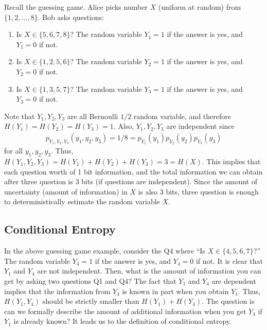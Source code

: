 \documentclass{article}
\begin{document}
\begin{example}
    Recall the guessing game.
    Alice picks number $X$ (uniform at random) from $\{1, 2, \dots, 8\}$.
    Bob asks questions:
    \begin{enumerate}[Q1:]
        \item Is $X\in\{5, 6, 7, 8\}$? The random variable $Y_1=1$ if the answer is yes, and $Y_1=0$ if not.
        \item Is $X\in\{1, 2, 5, 6\}$? The random variable $Y_2=1$ if the answer is yes, and $Y_2=0$ if not.
        \item Is $X\in\{1, 3, 5, 7\}$? The random variable $Y_3=1$ if the answer is yes, and $Y_3=0$ if not.
    \end{enumerate}
    Note that $Y_1, Y_2, Y_3$ are all Bernoulli $1/2$ random variable, and therefore $H(Y_1) = H(Y_2) = H(Y_3) = 1$.
    Also, $Y_1, Y_2, Y_3$ are independent since
    \begin{align}
        p_{Y_1, Y_2, Y_3}(y_1, y_2, y_3) = 1/8 = p_{Y_1}(y_1)p_{Y_2}(y_2)p_{Y_3}(y_3)
    \end{align}
    for all $y_1, y_2, y_3$.
    Thus, $H(Y_1, Y_2, Y_3) = H(Y_1)+H(Y_2)+H(Y_3) = 3 = H(X)$.
    This implies that each question worth of 1 bit information, and the total information we can obtain after three question is 3 bits (if questions are independent).
    Since the amount of uncertainty (amount of information) in $X$ is also 3 bits, three question is enough to deterministically estimate the random variable $X$.
\end{example}


\subsection{Conditional Entropy}
In the above guessing game example, consider the Q4 where ``Is $X\in\{4, 5, 6, 7\}$?'' 
The random variable $Y_4=1$ if the answer is yes, and $Y_4=0$ if not.
It is clear that $Y_1$ and $Y_4$ are not independent.
Then, what is the amount of information you can get by asking two questions Q1 and Q4?
The fact that $Y_1$ and $Y_4$ are dependent implies that the information from $Y_4$ is known in part when you obtain $Y_1$.
Thus, $H(Y_1, Y_4)$ should be strictly smaller than $H(Y_1)+H(Y_4)$.
The question is can we formally describe the amount of additional information when you get $Y_4$ if $Y_1$ is already known?
It leads us to the definition of conditional entropy.
\end{document}
